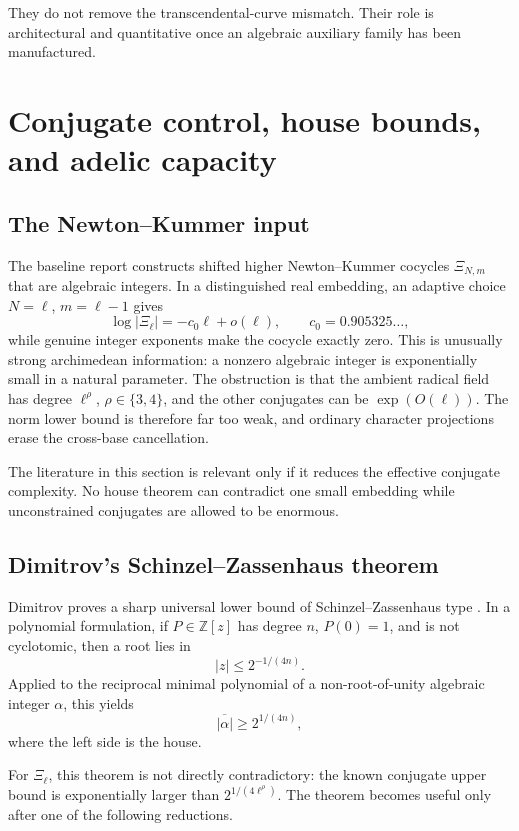 \documentclass[10pt,letterpaper]{article}
\newcommand{\Z}{\mathbb Z}
\begin{document}
They do not remove the transcendental-curve mismatch.  Their role is architectural and
quantitative once an algebraic auxiliary family has been manufactured.

\clearpage
\section{Conjugate control, house bounds, and adelic capacity}
\label{sec:capacity}

\subsection{The Newton--Kummer input}

The baseline report constructs shifted higher Newton--Kummer cocycles
\(\Xi_{N,m}\) that are algebraic integers.  In a distinguished real embedding, an adaptive
choice \(N=\ell\), \(m=\ell-1\) gives
\[
  \log|\Xi_\ell|=-c_0\ell+o(\ell),
  \qquad c_0=0.905325\ldots,
\]
while genuine integer exponents make the cocycle exactly zero.  This is unusually strong
archimedean information: a nonzero algebraic integer is exponentially small in a natural
parameter.  The obstruction is that the ambient radical field has degree
\(\ell^\rho\), \(\rho\in\{3,4\}\), and the other conjugates can be
\(\exp(O(\ell))\).  The norm lower bound is therefore far too weak, and ordinary character
projections erase the cross-base cancellation.

The literature in this section is relevant only if it reduces the effective conjugate
complexity.  No house theorem can contradict one small embedding while unconstrained
conjugates are allowed to be enormous.

\subsection{Dimitrov's Schinzel--Zassenhaus theorem}

Dimitrov proves a sharp universal lower bound of Schinzel--Zassenhaus type
\cite{DimitrovSZ}.  In a polynomial formulation, if \(P\in\Z[z]\) has degree \(n\),
\(P(0)=1\), and is not cyclotomic, then a root lies in
\[
  |z|\leq 2^{-1/(4n)}.
\]
Applied to the reciprocal minimal polynomial of a non-root-of-unity algebraic integer
\(\alpha\), this yields
\[
  \overline{|\alpha|}\geq 2^{1/(4n)},
\]
where the left side is the house.

For \(\Xi_\ell\), this theorem is not directly contradictory: the known conjugate upper
bound is exponentially larger than \(2^{1/(4\ell^\rho)}\).  The theorem becomes useful only
after one of the following reductions.
\end{document}
